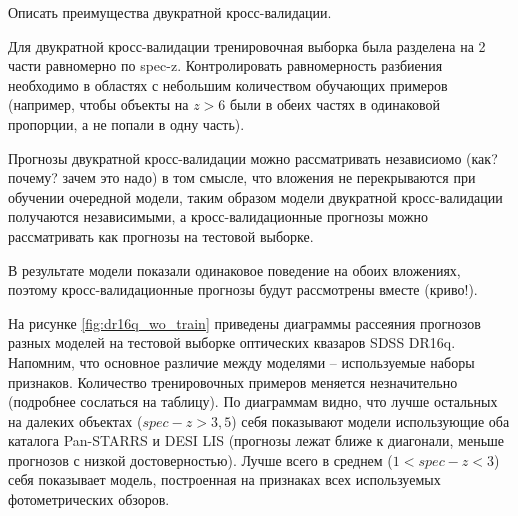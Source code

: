 \documentclass[fleqn,usenatbib]{mnras}
\begin{document}
Описать преимущества двукратной кросс-валидации.

Для двукратной кросс-валидации тренировочная выборка была разделена на 2 части равномерно по spec-z. Контролировать равномерность разбиения необходимо в областях с небольшим количеством обучающих примеров (например, чтобы объекты на $z > 6$ были в обеих частях в одинаковой пропорции, а не попали в одну часть).

Прогнозы двукратной кросс-валидации можно рассматривать независиомо (как? почему? зачем это надо) в том смысле, что вложения не перекрываются при обучении очередной модели, таким образом модели двукратной кросс-валидации получаются независимыми, а кросс-валидационные прогнозы можно рассматривать как прогнозы на тестовой выборке.

В результате модели показали одинаковое поведение на обоих вложениях, поэтому кросс-валидационные прогнозы будут рассмотрены вместе (криво!).

На рисунке \ref{fig:dr16q_wo_train} приведены диаграммы рассеяния прогнозов разных моделей на тестовой выборке оптических квазаров SDSS DR16q. Напомним, что основное различие между моделями -- используемые наборы признаков. Количество тренировочных примеров меняется незначительно (подробнее сослаться на таблицу). По диаграммам видно, что  лучше остальных на далеких объектах ($spec-z > 3,5$) себя показывают модели использующие оба каталога Pan-STARRS и DESI LIS (прогнозы лежат ближе к диагонали, меньше прогнозов с низкой достоверностью). Лучше всего в среднем ($1 < spec-z < 3$) себя показывает модель, построенная на признаках всех используемых фотометрических обзоров.
\end{document}
